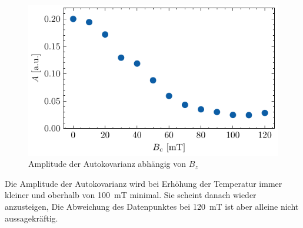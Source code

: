 \documentclass[main.tex]{subfiles}
\begin{document}
\begin{figure}[H]
    \centering
    \includegraphics{bilder/plots/max_Bz/rauschamplitude.pdf}
    \caption{Amplitude der Autokovarianz abhängig von \(B_z\)}\label{fig:bz-rauschampl}
\end{figure}

Die Amplitude der Autokovarianz wird bei Erhöhung der Temperatur immer kleiner und oberhalb von \SI{100}{\milli\tesla} minimal. Sie scheint danach wieder anzusteigen, Die Abweichung des Datenpunktes bei \SI{120}{\milli\tesla} ist aber alleine nicht aussagekräftig. 


\end{document}
